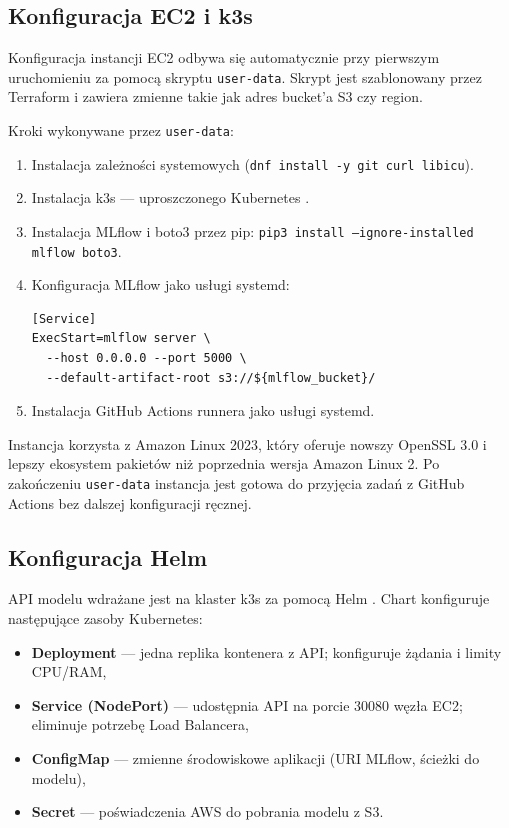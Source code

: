 \subsection{Konfiguracja EC2 i k3s}

Konfiguracja instancji EC2 odbywa się automatycznie przy pierwszym uruchomieniu za pomocą skryptu \texttt{user-data}. Skrypt jest szablonowany przez Terraform i zawiera zmienne takie jak adres bucket'a S3 czy region.

Kroki wykonywane przez \texttt{user-data}:
\begin{enumerate}
  \item Instalacja zależności systemowych (\texttt{dnf install -y git curl libicu}).
  \item Instalacja k3s --- uproszczonego Kubernetes \cite{k3s_docs}.
  \item Instalacja MLflow i boto3 przez pip: \texttt{pip3 install --ignore-installed mlflow boto3}.
  \item Konfiguracja MLflow jako usługi systemd:
\begin{verbatim}
[Service]
ExecStart=mlflow server \
  --host 0.0.0.0 --port 5000 \
  --default-artifact-root s3://${mlflow_bucket}/
\end{verbatim}
  \item Instalacja GitHub Actions runnera jako usługi systemd.
\end{enumerate}

Instancja korzysta z Amazon Linux 2023, który oferuje nowszy OpenSSL 3.0 i lepszy ekosystem pakietów niż poprzednia wersja Amazon Linux 2. Po zakończeniu \texttt{user-data} instancja jest gotowa do przyjęcia zadań z GitHub Actions bez dalszej konfiguracji ręcznej.


\subsection{Konfiguracja Helm}

API modelu wdrażane jest na klaster k3s za pomocą Helm \cite{helm_docs}. Chart konfiguruje następujące zasoby Kubernetes:
\begin{itemize}
  \item \textbf{Deployment} --- jedna replika kontenera z API; konfiguruje żądania i limity CPU/RAM,
  \item \textbf{Service (NodePort)} --- udostępnia API na porcie 30080 węzła EC2; eliminuje potrzebę Load Balancera,
  \item \textbf{ConfigMap} --- zmienne środowiskowe aplikacji (URI MLflow, ścieżki do modelu),
  \item \textbf{Secret} --- poświadczenia AWS do pobrania modelu z S3.
\end{itemize}

